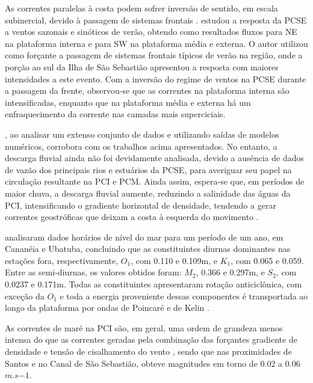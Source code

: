 \hspace{5mm} As correntes paralelas à costa podem sofrer inversão de sentido, em escala subinercial, devido à passagem de sistemas frontais \citep{stech1992response,dottori2009response}. \cite{coelho2008resposta} estudou a resposta da PCSE a ventos sazonais e sinóticos de verão, obtendo como resultados fluxos para NE na plataforma interna e para SW na plataforma média e externa. O autor utilizou como forçante a passagem de sistemas frontais típicos de verão na região, onde a porção ao sul da Ilha de São Sebastião apresentou a resposta com maiores intensidades a este evento. Com a inversão do regime de ventos na PCSE durante a passagem da frente, observou-se que as correntes na plataforma interna são intensificadas, enquanto que na plataforma média e externa há um enfraquecimento da corrente nas camadas mais superciciais.


\hspace{5mm} \cite{morais2016hidrodinamica}, ao analisar um extenso conjunto de dados e utilizando saídas de modelos numéricos, corrobora com os trabalhos acima apresentados. No entanto, a descarga fluvial ainda não foi devidamente analisada, devido a ausência de dados de vazão dos principais rios e estuários da PCSE, para averiguar seu papel na circulação resultante na PCI e PCM. Ainda assim, espera-se que, em períodos de maior chuva, a descarga fluvial aumente, reduzindo a salinidade das águas da PCI, intensificando o gradiente horizontal de densidade, tendendo a gerar correntes geostróficas que deixam a costa à esquerda do movimento \citep{de2003intrusoes}.


\hspace{5mm} \cite{mesquita1983tides} analisaram dados horários de nível do mar para um período de um ano, em Cananéia e Ubatuba, concluindo que as constituintes diurnas dominantes nas estações fora, respectivamente, $O_1$, com 0.110 e 0.109m, e $K_1$, com 0.065 e 0.059. Entre as semi-diurnas, os valores obtidos foram: $M_2$, 0.366 e 0.297m, e $S_2$, com 0.0237 e 0.171m. Todas as constituintes apresentaram rotação anticiclônica, com exceção da $O_1$ e toda a energia proveniente dessas componentes é transportada ao longo da plataforma por ondas de Poincaré e de Kelin \citep{munk1970tides}.

\hspace{5mm} As correntes de maré na PCI são, em geral, uma ordem de grandeza menos intensa do que as correntes geradas pela combinação das forçantes gradiente de densidade e tensão de cisalhamento do vento \citep{castro1996correntes}, sendo que nas proximidades de Santos e no Canal de São Sebastião, \cite{valente1999circulaccao} obteve magnitudes em torno de 0.02 a 0.06 $m.s{-1}$.

